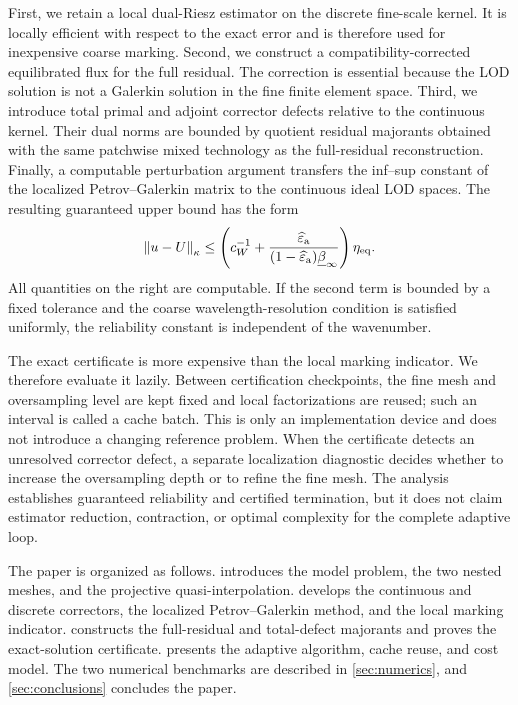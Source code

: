 First, we retain a local dual-Riesz estimator on the discrete fine-scale
kernel.  It is locally efficient with respect to the exact error and is
therefore used for inexpensive coarse marking.  Second, we construct a
compatibility-corrected equilibrated flux for the full residual.  The
correction is essential because the LOD solution is not a Galerkin solution
in the fine finite element space.  Third, we introduce total primal and
adjoint corrector defects relative to the continuous kernel.  Their dual
norms are bounded by quotient residual majorants obtained with the same
patchwise mixed technology as the full-residual reconstruction.  Finally,
a computable perturbation argument transfers the inf--sup constant of the
localized Petrov--Galerkin matrix to the continuous ideal LOD spaces.  The
resulting guaranteed upper bound has the form
\[
  \left\lVert u-U\right\rVert_\kappa
  \leq
  \left(
    c_W^{-1}
    +
    \frac{\widehat\varepsilon_{\mathrm a}}{(1-\widehat\varepsilon_{\mathrm a})\underline\beta_\infty}
  \right)\eta_{\mathrm{eq}}.
\]
All quantities on the right are computable.  If the second term is bounded
by a fixed tolerance and the coarse wavelength-resolution condition is
satisfied uniformly, the reliability constant is independent of the
wavenumber.

The exact certificate is more expensive than the local marking indicator.
We therefore evaluate it lazily.  Between certification checkpoints, the
fine mesh and oversampling level are kept fixed and local factorizations are
reused; such an interval is called a cache batch.  This is only an
implementation device and does not introduce a changing reference problem.
When the certificate detects an unresolved corrector defect, a separate
localization diagnostic decides whether to increase the oversampling depth
or to refine the fine mesh.  The analysis establishes guaranteed
reliability and certified termination, but it does not claim estimator
reduction, contraction, or optimal complexity for the complete adaptive
loop.

The paper is organized as follows.   introduces the
model problem, the two nested meshes, and the projective quasi-interpolation.
 develops the continuous and discrete correctors,
the localized Petrov--Galerkin method, and the local marking indicator.
 constructs the full-residual and total-defect
majorants and proves the exact-solution certificate.
 presents the adaptive algorithm, cache reuse, and cost
model.  The two numerical benchmarks are described in
\cref{sec:numerics}, and \cref{sec:conclusions} concludes the paper.


